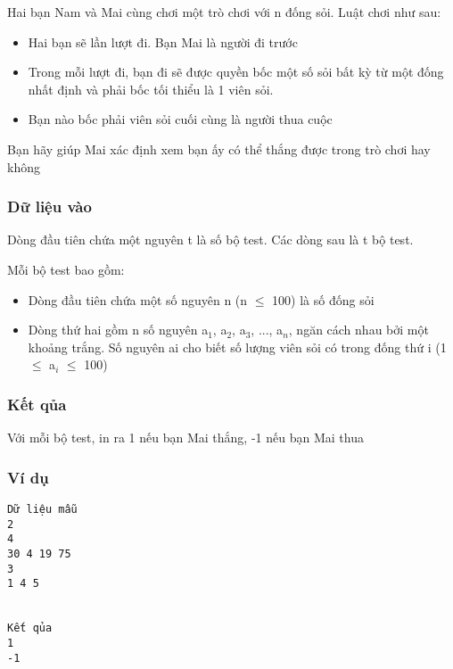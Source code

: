 

Hai bạn Nam và Mai cùng chơi một trò chơi với n đống sỏi. Luật chơi như sau:
\begin{itemize}
	\item Hai bạn sẽ lần lượt đi. Bạn Mai là người đi trước
	\item Trong mỗi lượt đi, bạn đi sẽ được quyền bốc một số sỏi bất kỳ từ một đống nhất định và phải bốc tối thiểu là 1 viên sỏi.
	\item Bạn nào bốc phải viên sỏi cuối cùng là người thua cuộc
\end{itemize}

Bạn hãy giúp Mai xác định xem bạn ấy có thể thắng được trong trò chơi hay không

\subsubsection{Dữ liệu vào}

Dòng đầu tiên chứa một nguyên t là số bộ test. Các dòng sau là t bộ test.

Mỗi bộ test bao gồm:
\begin{itemize}
	\item Dòng đầu tiên chứa một số nguyên n (n  $\le$  100) là số đống sỏi
	\item Dòng thứ hai gồm n số nguyên a$_1$, a$_2$, a$_3$, ..., a$_n$, ngăn cách nhau bởi một khoảng trắng. Số nguyên ai cho biết số lượng viên sỏi có trong đống thứ i (1  $\le$  a$_i $  $\le$  100)
\end{itemize}

\subsubsection{Kết qủa}

Với mỗi bộ test, in ra 1 nếu bạn Mai thắng, -1 nếu bạn Mai thua

\subsubsection{Ví dụ}
\begin{verbatim}
Dữ liệu mẫu
2
4
30 4 19 75
3
1 4 5


Kết qủa
1
-1
\end{verbatim}
